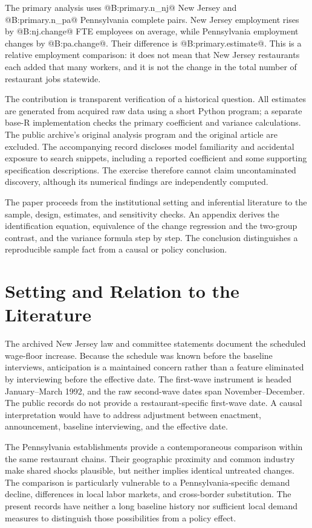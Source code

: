 \documentclass[11pt]{article}
\begin{document}
The primary analysis uses @B:primary.n_nj@ New Jersey and @B:primary.n_pa@ Pennsylvania complete pairs. New Jersey employment rises by @B:nj.change@ FTE employees on average, while Pennsylvania employment changes by @B:pa.change@. Their difference is @B:primary.estimate@. This is a relative employment comparison: it does not mean that New Jersey restaurants each added that many workers, and it is not the change in the total number of restaurant jobs statewide. %

The contribution is transparent verification of a historical question. All estimates are generated from acquired raw data using a short Python program; a separate base-R implementation checks the primary coefficient and variance calculations. The public archive's original analysis program and the original article are excluded. The accompanying record discloses model familiarity and accidental exposure to search snippets, including a reported coefficient and some supporting specification descriptions. The exercise therefore cannot claim uncontaminated discovery, although its numerical findings are independently computed. %

The paper proceeds from the institutional setting and inferential literature to the sample, design, estimates, and sensitivity checks. An appendix derives the identification equation, equivalence of the change regression and the two-group contrast, and the variance formula step by step. The conclusion distinguishes a reproducible sample fact from a causal or policy conclusion. %

\section{Setting and Relation to the Literature}
The archived New Jersey law and committee statements document the scheduled wage-floor increase. Because the schedule was known before the baseline interviews, anticipation is a maintained concern rather than a feature eliminated by interviewing before the effective date. The first-wave instrument is headed January--March 1992, and the raw second-wave dates span November--December. The public records do not provide a restaurant-specific first-wave date. A causal interpretation would have to address adjustment between enactment, announcement, baseline interviewing, and the effective date. %

The Pennsylvania establishments provide a contemporaneous comparison within the same restaurant chains. Their geographic proximity and common industry make shared shocks plausible, but neither implies identical untreated changes. The comparison is particularly vulnerable to a Pennsylvania-specific demand decline, differences in local labor markets, and cross-border substitution. The present records have neither a long baseline history nor sufficient local demand measures to distinguish those possibilities from a policy effect. %
\end{document}
